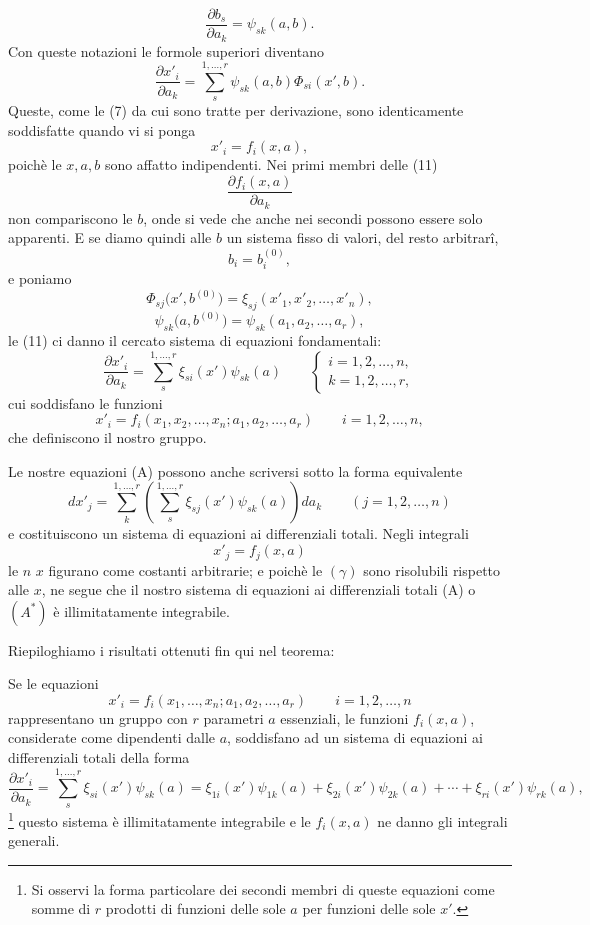 \documentclass[11pt]{book}
\begin{document}
\[
 \frac{\partial b_s}{\partial a_k}=\psi_{sk}(a,b).
\]
Con queste notazioni le formole superiori diventano
\begin{equation*}\tag{11}
 \frac{\partial x'_i}{\partial a_k}
 =\sum\limits_s^{1,\ldots,r}\psi_{sk}(a,b)\Phi_{si}(x',b).
\end{equation*}
Queste, come le (7) da cui sono tratte per derivazione, sono identicamente soddisfatte quando vi si ponga
\[
 x'_i=f_i(x,a),
\]
poichè le $x,a,b$ sono affatto indipendenti. Nei primi membri delle (11)
\[
 \frac{\partial f_i(x,a)}{\partial a_k}
\]
non compariscono le $b$, onde si vede che anche nei secondi possono essere solo apparenti. E se diamo quindi alle $b$ un sistema fisso di valori, del resto arbitrarî,
\[
 b_i=b_i^{(0)},
\]
e poniamo
\[
 \Phi_{sj}\bigl(x',b^{(0)}\bigr)=\xi_{sj}(x'_1,x'_2,\ldots,x'_n),
\]
\[
 \psi_{sk}\bigl(a,b^{(0)}\bigr)=\psi_{sk}(a_1,a_2,\ldots,a_r),
\]
le (11) ci danno il cercato sistema di equazioni fondamentali:
\begin{equation*}\tag{A}
 \frac{\partial x'_i}{\partial a_k}
 =\sum\limits_s^{1,\ldots,r}\xi_{si}(x')\psi_{sk}(a)
 \qquad
 \begin{cases}
 i=1,2,\ldots,n,\\
 k=1,2,\ldots,r,
 \end{cases}
\end{equation*}
cui soddisfano le funzioni
\[
 x'_i=f_i(x_1,x_2,\ldots,x_n;a_1,a_2,\ldots,a_r)
 \qquad i=1,2,\ldots,n,
\]
che definiscono il nostro gruppo.

Le nostre equazioni (A) possono anche scriversi sotto la forma equivalente
\begin{equation*}\tag{$A^*$}
 dx'_j=\sum\limits_k^{1,\ldots,r}\left(\sum\limits_s^{1,\ldots,r}\xi_{sj}(x')\psi_{sk}(a)\right)da_k
 \qquad (j=1,2,\ldots,n)
\end{equation*}
e costituiscono un sistema di equazioni ai differenziali totali. Negli integrali
\begin{equation*}\tag{$\gamma$}
 x'_j=f_j(x,a)
\end{equation*}
le $n$ $x$ figurano come costanti arbitrarie; e poichè le $(\gamma)$ sono risolubili rispetto alle $x$, ne segue che il nostro sistema di equazioni ai differenziali totali (A) o $(A^*)$ è illimitatamente integrabile.

Riepiloghiamo i risultati ottenuti fin qui nel teorema:

Se le equazioni
\[
 x'_i=f_i(x_1,\ldots,x_n; a_1,a_2,\ldots,a_r)
 \qquad i=1,2,\ldots,n
\]
rappresentano un gruppo con $r$ parametri $a$ essenziali, le funzioni $f_i(x,a)$, considerate come dipendenti dalle $a$, soddisfano ad un sistema di equazioni ai differenziali totali della forma
\begin{equation*}\tag{A}
 \frac{\partial x'_i}{\partial a_k}
 =\sum\limits_s^{1,\ldots,r}\xi_{si}(x')\psi_{sk}(a)
 =\xi_{1i}(x')\psi_{1k}(a)+\xi_{2i}(x')\psi_{2k}(a)+\cdots+\xi_{ri}(x')\psi_{rk}(a),
\end{equation*}
\footnote{Si osservi la forma particolare dei secondi membri di queste equazioni come somme di $r$ prodotti di funzioni delle sole $a$ per funzioni delle sole $x'$.}
questo sistema è illimitatamente integrabile e le $f_i(x,a)$ ne danno gli integrali generali.
\end{document}
